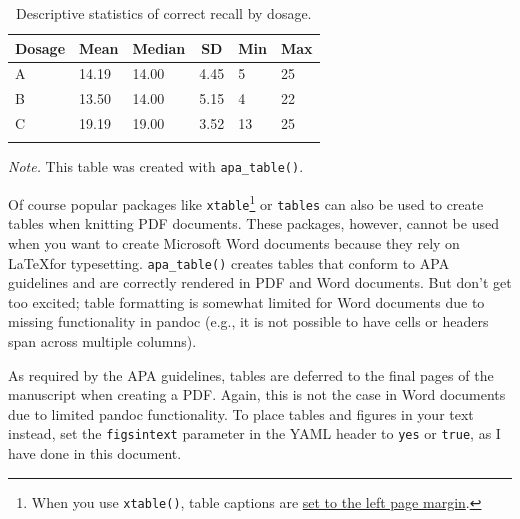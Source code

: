 \documentclass[english,man,floatsintext]{apa6}
\begin{document}
\begin{table}[tbp]

\begin{center}
\begin{threeparttable}

\caption{\label{tab:descriptives}Descriptive statistics of correct recall by dosage.}

\begin{tabular}{llllll}
\toprule
Dosage & \multicolumn{1}{c}{Mean} & \multicolumn{1}{c}{Median} & \multicolumn{1}{c}{SD} & \multicolumn{1}{c}{Min} & \multicolumn{1}{c}{Max}\\
\midrule
A & 14.19 & 14.00 & 4.45 & 5 & 25\\
B & 13.50 & 14.00 & 5.15 & 4 & 22\\
C & 19.19 & 19.00 & 3.52 & 13 & 25\\
\bottomrule
\addlinespace
\end{tabular}

\begin{tablenotes}[para]
\normalsize{\textit{Note.} This table was created with \texttt{apa\_table()}.}
\end{tablenotes}

\end{threeparttable}
\end{center}

\end{table}

Of course popular packages like \texttt{xtable}\footnote{When you use \texttt{xtable()}, table captions are \href{http://tex.stackexchange.com/questions/42209/centering-tables-in-document-class-apa6}{set to the left page margin}.} or \texttt{tables} can also be used to create tables when knitting PDF documents.
These packages, however, cannot be used when you want to create Microsoft Word documents because they rely on \LaTeX for typesetting.
\texttt{apa\_table()} creates tables that conform to APA guidelines and are correctly rendered in PDF and Word documents.
But don't get too excited; table formatting is somewhat limited for Word documents due to missing functionality in pandoc (e.g., it is not possible to have cells or headers span across multiple columns).

As required by the APA guidelines, tables are deferred to the final pages of the manuscript when creating a PDF.
Again, this is not the case in Word documents due to limited pandoc functionality.
To place tables and figures in your text instead, set the \texttt{figsintext} parameter in the YAML header to \texttt{yes} or \texttt{true}, as I have done in this document.
\end{document}
